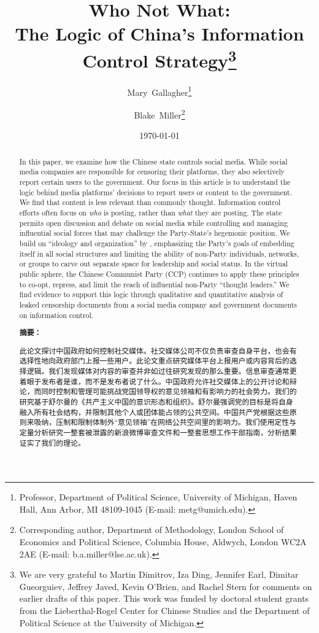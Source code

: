 \documentclass[12pt]{article}
\title{Who Not What: \\ \large The Logic of China's Information Control Strategy\thanks{We are very grateful to Martin Dimitrov, Iza Ding, Jennifer Earl, Dimitar Gueorguiev, Jeffrey Javed, Kevin O'Brien, and Rachel Stern for comments on earlier drafts of this paper. This work was funded by doctoral student grants from the Lieberthal-Rogel Center for Chinese Studies and the Department of Political Science at the University of Michigan.}}
\author{Mary\ Gallagher\thanks{\normalsize Professor, Department of Political Science, University of Michigan, Haven Hall, Ann Arbor, MI 48109-1045 (E-mail: \mbox{metg@umich.edu}).} \and Blake\ Miller\thanks{\normalsize Corresponding author,
    Department of Methodology, London School of Economics and Political Science, Columbia House, Aldwych, London WC2A 2AE (E-mail: \mbox{b.a.miller@lse.ac.uk}).}}
\date{\today\vspace{1em}\\}
\begin{document}
\begin{CJK*}{UTF8}{gbsn}
\maketitle\vspace{-2em}
{
\begin{abstract}
In this paper, we examine how the Chinese state controls social media. While social media companies are responsible for censoring their platforms, they also selectively report certain users to the government. Our focus in this article is to understand the logic behind media platforms' decisions to report users or content to the government. We find that content is less relevant than commonly thought. Information control efforts often focus on {\it who} is posting, rather than {\it what} they are posting. The state permits open discussion and debate on social media while controlling and managing influential social forces that may challenge the Party-State's hegemonic position. We build on ``ideology and organization'' by \cite{schurmann1968ideology}, emphasizing the Party's goals of embedding itself in all social structures and limiting the ability of non-Party individuals, networks, or groups to carve out separate space for leadership and social status. In the virtual public sphere, the Chinese Communist Party (CCP) continues to apply these principles to co-opt, repress, and limit the reach of influential non-Party ``thought leaders.'' We find evidence to support this logic through qualitative and quantitative analysis of leaked censorship documents from a social media company and government documents on information control.\\

\begin{center}
    {\bf 摘要：}
\end{center}

此论文探讨中国政府如何控制社交媒体。社交媒体公司不仅负责审查自身平台，也会有选择性地向政府部门上报一些用户。此论文重点研究媒体平台上报用户或内容背后的选择逻辑。我们发现媒体对内容的审查并非如过往研究发现的那么重要。信息审查通常更着眼于发布者是谁，而不是发布者说了什么。中国政府允许社交媒体上的公开讨论和辩论，而同时控制和管理可能挑战党国领导权的意见领袖和有影响力的社会势力。我们的研究基于舒尔曼的《共产主义中国的意识形态和组织》。舒尔曼强调党的目标是将自身融入所有社会结构，并限制其他个人或团体能占领的公共空间。中国共产党根据这些原则来吸纳，压制和限制体制外“意见领袖”在网络公共空间里的影响力。我们使用定性与定量分析研究一整套被泄露的新浪微博审查文件和一整套思想工作干部指南，分析结果证实了我们的理论。\\


\end{abstract}}
\end{CJK*}
\end{document}
